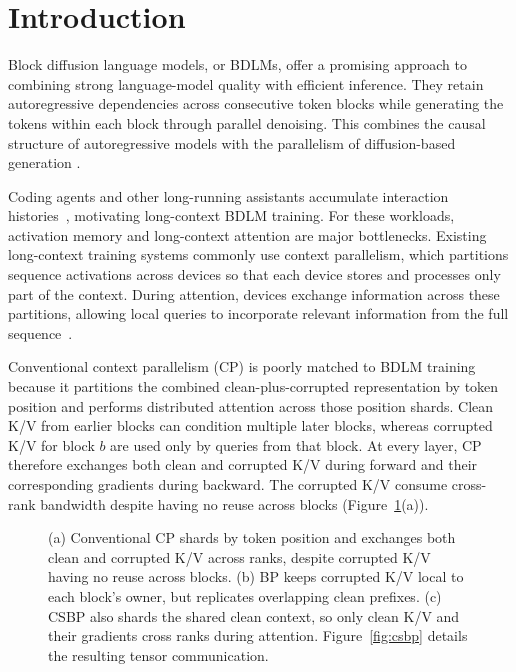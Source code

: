 \section{Introduction}
\label{sec:introduction}

\ifdefined\preprintfrontierfigure
\preprintfrontierfigure
\fi

Block diffusion language models, or BDLMs, offer a promising approach to
combining strong language-model quality with efficient inference. They retain
autoregressive dependencies across consecutive token blocks while generating
the tokens within each block through parallel denoising. This combines the
causal structure of autoregressive models with the parallelism of
diffusion-based generation
\citep{arriola2025blockdiffusion,odonoghue2026diffusiongemma,fu2026nemotronlabsdiffusion}.

Coding agents and other long-running assistants accumulate interaction
histories~\citep{yang2024sweagent,yao2023react}, motivating long-context BDLM
training.
For these workloads, activation memory and long-context attention are major
bottlenecks. Existing long-context training systems commonly use context
parallelism, which partitions sequence activations across devices so that each
device stores and processes only part of the context. During attention, devices
exchange information across these partitions, allowing local queries to
incorporate relevant information from the full
sequence~\citep{liu2023ringattention,jacobs2023ulysses}.

Conventional context parallelism (CP) is poorly matched to BDLM training
because it partitions the combined clean-plus-corrupted representation by
token position and performs distributed attention across those position
shards. Clean K/V from earlier blocks can condition multiple later blocks,
whereas corrupted K/V for block $b$ are used only by queries from that block.
At every layer, CP therefore exchanges both clean and corrupted K/V during
forward and their corresponding gradients during backward. The corrupted K/V
consume cross-rank bandwidth despite having no reuse across blocks
(Figure~\ref{fig:block-parallel-overview}(a)).

\begin{figure}[t]
    \centering
    \resizebox{\linewidth}{!}{}
    \caption{(a) Conventional CP shards by token position and exchanges both clean and corrupted K/V across ranks,
    despite corrupted K/V having no reuse across blocks. (b) BP keeps
    corrupted K/V local to each block's owner, but replicates overlapping
    clean prefixes. (c) CSBP also shards the shared clean context, so only
    clean K/V and their gradients cross ranks during attention.
    Figure~\ref{fig:csbp} details the resulting tensor communication.}
    \label{fig:block-parallel-overview}
\end{figure}

